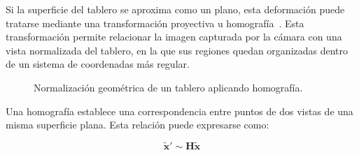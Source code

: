 Si la superficie del tablero se aproxima como un plano, esta deformación puede tratarse mediante una transformación proyectiva u homografía~\cite{szeliski2022computerVision}. Esta transformación permite relacionar la imagen capturada por la cámara con una vista normalizada del tablero, en la que sus regiones quedan organizadas dentro de un sistema de coordenadas más regular.

\vspace{0.5cm}
\begin{figure}[H]
    \centering
    \caption{Normalización geométrica de un tablero aplicando homografía.}
\end{figure}

Una homografía establece una correspondencia entre puntos de dos vistas de una misma superficie plana. Esta relación puede expresarse como:

\[
\tilde{\mathbf{x}}' \sim \mathbf{H}\tilde{\mathbf{x}}
\]

